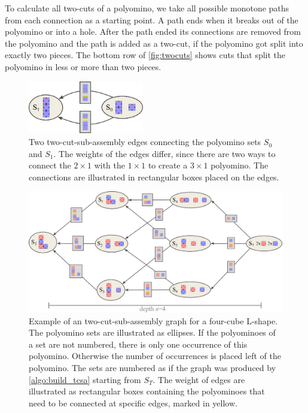 To calculate all two-cuts of a polyomino, we take all possible monotone paths from each connection as a starting point.
A path ends when it breaks out of the polyomino or into a hole.
After the path ended its connections are removed from the polyomino and the path is added as a two-cut, if the polyomino got split into exactly two pieces.
The bottom row of \autoref{fig:twocuts} shows cuts that split the polyomino in less or more than two pieces.


\begin{figure}
	\centering
	\includegraphics[width=0.45\textwidth]{figures/tcsa_multiedge.pdf}
	\caption[Two two-cut-sub-assembly nodes connected with multiple edges.]{Two two-cut-sub-assembly edges connecting the polyomino sets $S_0$ and $S_1$. The weights of the edges differ, since there are two ways to connect the $2\times1$ with the $1\times1$ to create a $3\times1$ polyomino. The connections are illustrated in rectangular boxes placed on the edges.}
	\label{fig:tcsa_multiedge}
\end{figure}

\begin{figure}
	\centering
	\includegraphics[width=1\textwidth]{figures/tcsa.pdf}
	\caption[Example for a two-cut-sub-assembly graph.]{Example of an two-cut-sub-assembly graph for a four-cube L-shape. The polyomino sets are illustrated as ellipses. If the polyominoes of a set are not numbered, there is only one occurrence of this polyomino. Otherwise the number of occurrences is placed left of the polyomino. The sets are numbered as if the graph was produced by \autoref{algo:build_tcsa} starting from $S_T$. The weight of edges are illustrated as rectangular boxes containing the polyominoes that need to be connected at specific edges, marked in yellow.}
	\label{fig:tcsa}
\end{figure}

